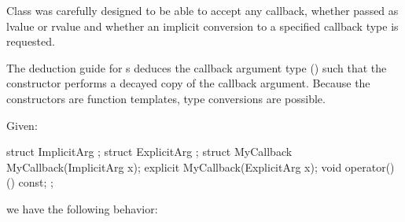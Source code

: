 Class  was carefully designed to be able to accept any callback,
whether passed as lvalue or rvalue and whether an implicit conversion
to a specified callback type is requested.

The deduction guide for s deduces the callback argument type
()
such that the constructor performs a decayed copy of the callback argument.
Because the constructors are function templates,
type conversions are possible.

Given:
\begin{codeblock}
struct ImplicitArg {
};
struct ExplicitArg {
};
struct MyCallback {
  MyCallback(ImplicitArg x);
  explicit MyCallback(ExplicitArg x);
  void operator()() const;
};
\end{codeblock}

we have the following behavior:

